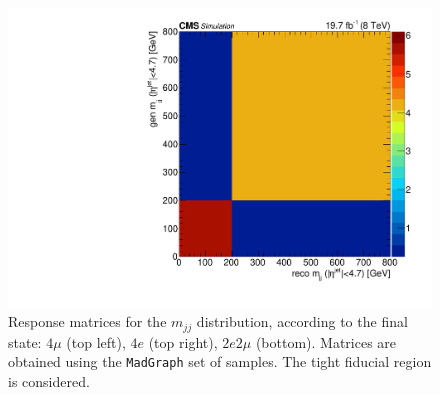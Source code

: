 \begin{figure}[hbtp]
\begin{center}
    \includegraphics[width=\cmsFigWidth]{Figures/ResMat_qqggJJ_Mjj_ZZTo2e2m_st_01_fr_Mad}     
    \caption{Response matrices for the $m_{jj}$ distribution, according to the final state:  $4\mu$ (top left), $4e$ (top right), $2e2\mu$  (bottom). Matrices are obtained using the  \texttt{MadGraph} set of samples. The tight fiducial region is considered.} 
    \label{fig:Mjj_matrices}
  \end{center}
\end{figure}
